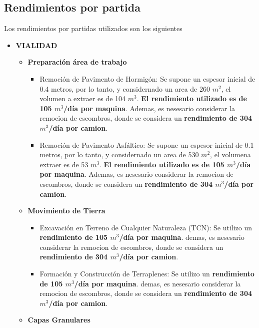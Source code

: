 \subsection{Rendimientos por partida}

Los rendimientos por partidas utilizados son los siguientes

\begin{itemize}
    \item \textbf{VIALIDAD}
    \begin{itemize}
        \item \textbf{Preparación área de trabajo}
        \begin{itemize}
            \item Remoción de Pavimento de Hormigón: Se supone un espesor inicial de 0.4 metros, por lo tanto, y considernado un area de 260 $m^2$, 
            el volumen a extraer es de 104 $m^3$. \textbf{El rendimiento utilizado es de 105 $m^3$/día por maquina}. Ademas, es nesesario considerar la remocion de escombros,
            donde se considera un \textbf{rendimiento de 304 $m^3$/día por camion}.
            \item Remoción de Pavimento Asfáltico: Se supone un espesor inicial de 0.1 metros, por lo tanto, y considernado un area de 530 $m^2$,
            el volumena extraer es de 53 $m^3$. \textbf{El rendimiento utilizado es de 105 $m^3$/día por maquina}. Ademas, es nesesario considerar la remocion de escombros,
            donde se considera un \textbf{rendimiento de 304 $m^3$/día por camion}.
        \end{itemize}
        \item \textbf{Movimiento de Tierra}
        \begin{itemize}
            \item Excavación en Terreno de Cualquier Naturaleza (TCN): Se utilizo un \textbf{rendimiento de 105 $m^3$/día por maquina}. demas, es nesesario considerar la remocion de escombros,
            donde se considera un \textbf{rendimiento de 304 $m^3$/día por camion}.
            \item Formación y Construcción de Terraplenes: Se utilizo un \textbf{rendimiento de 105 $m^3$/día por maquina}. demas, es nesesario considerar la remocion de escombros,
            donde se considera un \textbf{rendimiento de 304 $m^3$/día por camion}.
        \end{itemize}
        \item \textbf{Capas Granulares}
        \begin{itemize}

\end{itemize}
\end{itemize}
\end{itemize}
